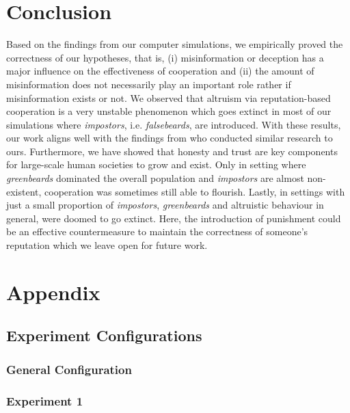 \documentclass[sigconf]{acmart}
\newcommand{\impostors}{\textit{impostors}\xspace}
\newcommand{\greenbeards}{\textit{greenbeards}\xspace}
\begin{document}
    \section{Conclusion}\label{sec:conclusion}
    Based on the findings from our computer simulations, we empirically proved the correctness of our hypotheses, that is, (i) misinformation or deception has a major influence on the effectiveness of cooperation and (ii) the amount of misinformation does not necessarily play an important role rather if misinformation exists or not.
    We observed that altruism via reputation-based cooperation is a very unstable phenomenon which goes extinct in most of our simulations where \impostors, i.e. \textit{falsebeards}, are introduced.
    With these results, our work aligns well with the findings from \citeauthor{szamado_deception_2016} who conducted similar research to ours.
    Furthermore, we have showed that honesty and trust are key components for large-scale human societies to grow and exist.
    Only in setting where \greenbeards dominated the overall population and \impostors are almost non-existent, cooperation was sometimes still able to flourish.
    Lastly, in settings with just a small proportion of \impostors, \greenbeards and altruistic behaviour in general, were doomed to go extinct.
    Here, the introduction of punishment could be an effective countermeasure to maintain the correctness of someone's reputation which we leave open for future work.

    
    

    \clearpage

    \onecolumn
    \section*{Appendix}

    \subsection{Experiment Configurations}\label{sec:configs}
    \subsubsection*{General Configuration}
    

    \subsubsection*{Experiment 1}
    
\end{document}
